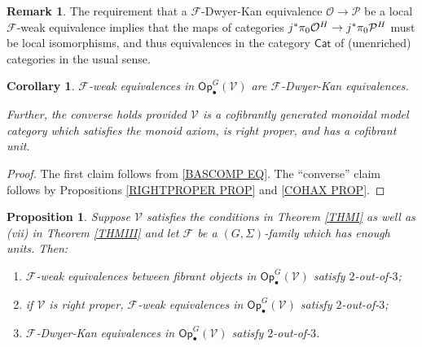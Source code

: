 \documentclass[a4paper,10pt
,draft
]{article}%
\numberwithin{equation}{section}
\numberwithin{figure}{section}
\newtheorem{proposition}[equation]{Proposition}%
\newtheorem{corollary}[equation]{Corollary}%
\theoremstyle{definition} %
\newtheorem{remark}[equation]{Remark}%
\newcommand{\F}{\ensuremath{\mathcal F}}
\newcommand{\V}{\ensuremath{\mathcal V}}
\renewcommand{\O}{\ensuremath{\mathcal O}}
\renewcommand{\P}{\ensuremath{\mathcal P}}
\newcommand{\1}{\ensuremath{\mathbbm 1}}%
\begin{document}
\begin{remark}\label{CATEQUIV REM}
The requirement that 
a $\F$-Dwyer-Kan equivalence $\O \to \P$
be a local $\F$-weak equivalence
implies that the maps of categories 
$j^{\**}\pi_0 \O^H \to j^{\**}\pi_0 \P^H$
must be local isomorphisms, 
and thus equivalences in the category $\mathsf{Cat}$
of (unenriched) categories in the usual sense.
\end{remark}



\begin{corollary}\label{WEDKEQ COR}
$\F$-weak equivalences in $\mathsf{Op}^G_\bullet(\V)$
are $\F$-Dwyer-Kan equivalences.
	
Further, the converse holds provided 
$\V$ is a cofibrantly generated monoidal model category
which satisfies the monoid axiom, is right proper,
and has a cofibrant unit.	
\end{corollary}

\begin{proof}
	The first claim follows from \eqref{BASCOMP EQ}.
	The ``converse'' claim follows by 
	Propositions \ref{RIGHTPROPER PROP} and \ref{COHAX PROP}.
\end{proof}






\begin{proposition}\label{2OUTOF3 PROP}
Suppose $\V$ satisfies the conditions in Theorem \ref{THMI} as well as 
(vii) in Theorem \ref{THMIII} and 
let $\F$ be a $(G,\Sigma)$-family which has enough units. 
Then:
\begin{enumerate}[label=(\roman*)]
\item $\F$-weak equivalences between fibrant objects in $\mathsf{Op}^G_\bullet(\V)$
satisfy $2$-out-of-$3$;
\item if $\V$ is right proper, $\F$-weak equivalences in $\mathsf{Op}^G_\bullet(\V)$
satisfy $2$-out-of-$3$;
\item $\F$-Dwyer-Kan equivalences in $\mathsf{Op}^G_\bullet(\V)$
satisfy $2$-out-of-$3$.
\end{enumerate}
\end{proposition}
\end{document}
